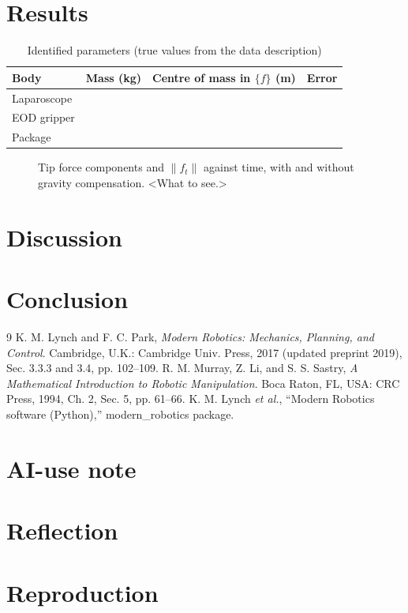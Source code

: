 \documentclass[conference]{IEEEtran}
\begin{document}
\section{Results}
\begin{table}[t]
\caption{Identified parameters (true values from the data description)}
\label{tab:params}
\centering
\begin{tabular}{@{}lccc@{}}
\toprule
Body & Mass (kg) & Centre of mass in $\{f\}$ (m) & Error \\
\midrule
Laparoscope & & & \\
EOD gripper & & & \\
Package & & & \\
\bottomrule
\end{tabular}
\end{table}

\begin{figure}[t]
\centering
\caption{Tip force components and $\|f_t\|$ against time, with and without gravity compensation. <What to see.>}
\label{fig:tipforce}
\end{figure}

\section{Discussion}

\section{Conclusion}

\begin{thebibliography}{9}
 K. M. Lynch and F. C. Park, \emph{Modern Robotics: Mechanics, Planning, and Control}.
Cambridge, U.K.: Cambridge Univ. Press, 2017 (updated preprint 2019), Sec. 3.3.3 and 3.4, pp. 102--109.
 R. M. Murray, Z. Li, and S. S. Sastry, \emph{A Mathematical Introduction to Robotic Manipulation}.
Boca Raton, FL, USA: CRC Press, 1994, Ch. 2, Sec. 5, pp. 61--66.
 K. M. Lynch \emph{et al.}, ``Modern Robotics software (Python),'' modern\_robotics package.
\end{thebibliography}

\appendices
\section{AI-use note}
\section{Reflection}
\section{Reproduction}
\end{document}
